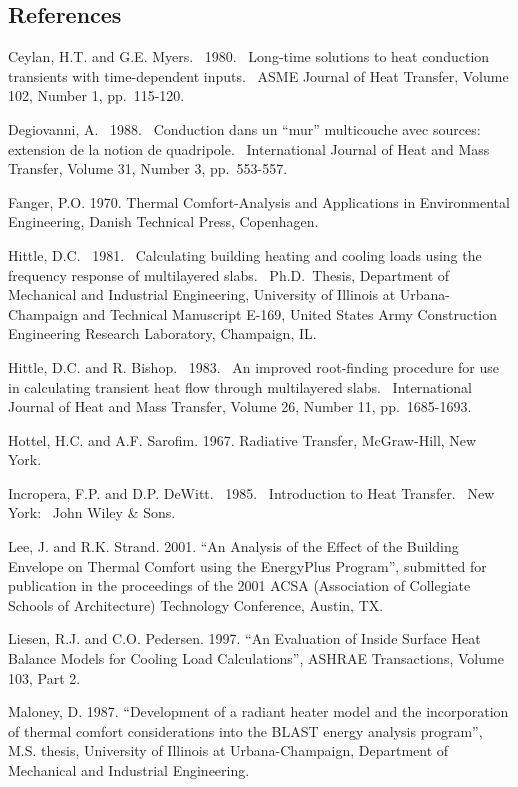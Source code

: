 \subsection{References}\label{references-039}

Ceylan, H.T. and G.E. Myers.~ 1980.~ Long-time solutions to heat conduction transients with time-dependent inputs.~ ASME Journal of Heat Transfer, Volume 102, Number 1, pp.~115-120.

Degiovanni, A.~ 1988.~ Conduction dans un ``mur'' multicouche avec sources:~ extension de la notion de quadripole.~ International Journal of Heat and Mass Transfer, Volume 31, Number 3, pp.~553-557.

Fanger, P.O. 1970. Thermal Comfort-Analysis and Applications in Environmental Engineering, Danish Technical Press, Copenhagen.

Hittle, D.C.~ 1981.~ Calculating building heating and cooling loads using the frequency response of multilayered slabs.~ Ph.D.~Thesis, Department of Mechanical and Industrial Engineering, University of Illinois at Urbana-Champaign and Technical Manuscript E-169, United States Army Construction Engineering Research Laboratory, Champaign, IL.

Hittle, D.C. and R. Bishop.~ 1983.~ An improved root-finding procedure for use in calculating transient heat flow through multilayered slabs.~ International Journal of Heat and Mass Transfer, Volume 26, Number 11, pp.~1685-1693.

Hottel, H.C. and A.F. Sarofim. 1967. Radiative Transfer, McGraw-Hill, New York.

Incropera, F.P. and D.P. DeWitt.~ 1985.~ Introduction to Heat Transfer.~ New York:~ John Wiley \& Sons.

Lee, J. and R.K. Strand. 2001. ``An Analysis of the Effect of the Building Envelope on Thermal Comfort using the EnergyPlus Program'', submitted for publication in the proceedings of the 2001 ACSA (Association of Collegiate Schools of Architecture) Technology Conference, Austin, TX.

Liesen, R.J. and C.O. Pedersen. 1997. ``An Evaluation of Inside Surface Heat Balance Models for Cooling Load Calculations'', ASHRAE Transactions, Volume 103, Part 2.

Maloney, D. 1987. ``Development of a radiant heater model and the incorporation of thermal comfort considerations into the BLAST energy analysis program'', M.S. thesis, University of Illinois at Urbana-Champaign, Department of Mechanical and Industrial Engineering.

